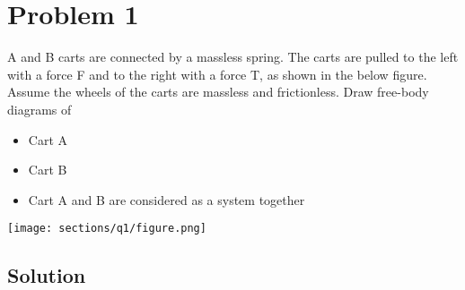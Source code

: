 \section*{Problem 1}

A and B carts are connected by a massless spring.
The carts are pulled to the left with a force F and to the right with a force T, as shown in the below figure.
Assume the wheels of the carts are massless and frictionless.
Draw free-body diagrams of
\begin{itemize}[itemsep=3pt,parsep=0pt,topsep=5pt,partopsep=0pt]
    \item Cart A
    \item Cart B
    \item Cart A and B are considered as a system together
\end{itemize}

\begin{figure*}[h]
    \centering
    \texttt{[image: sections/q1/figure.png]}
\end{figure*}

\subsection*{Solution}
